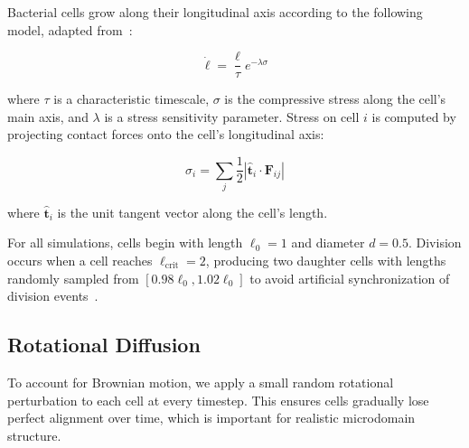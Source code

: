 \documentclass[conference]{IEEEtran}
\begin{document}
Bacterial cells grow along their longitudinal axis according to the following model, adapted from~\cite{Weady2024SM}:

\begin{equation} \label{eq:growth}
    \dot{\ell} = \frac{\ell}{\tau} e^{-\lambda \sigma}
\end{equation}

where $\tau$ is a characteristic timescale, $\sigma$ is the compressive stress along the cell's main axis, and $\lambda$ is a stress sensitivity parameter. Stress on cell $i$ is computed by projecting contact forces onto the cell's longitudinal axis:

\begin{equation} \label{eq:stress}
    \sigma_i = \sum_{j} \frac{1}{2} \left| \hat{\mathbf{t}}_i \cdot \mathbf{F}_{ij} \right|
\end{equation}

where $\hat{\mathbf{t}}_i$ is the unit tangent vector along the cell's length.

For all simulations, cells begin with length $\ell_0 = 1$ and diameter $d = 0.5$. Division occurs when a cell reaches $\ell_{\text{crit}} = 2$, producing two daughter cells with lengths randomly sampled from $[0.98\ell_0, 1.02\ell_0]$ to avoid artificial synchronization of division events~\cite{Khan_2024}.

\subsection{Rotational Diffusion}

To account for Brownian motion, we apply a small random rotational perturbation to each cell at every timestep. This ensures cells gradually lose perfect alignment over time, which is important for realistic microdomain structure.
\end{document}
